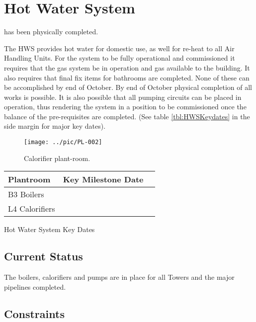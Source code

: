 \chapter{Hot Water System  }


 has been physically completed.

The HWS provides hot water for domestic use, as well for re-heat to all Air Handling Units. For the system to be fully operational and commissioned it requires that the gas system  be in operation and gas available to the building. It also requires that final fix items for bathrooms are completed. None of these can be accomplished by end of October. By end of October physical completion of all works is possible. It is also possible that all pumping circuits can be placed in operation, thus rendering the system in a position to be commissioned once the balance of the pre-requisites are completed. (See table \ref{tbl:HWSKeydates} in the side margin for major key dates).

\begin{figure*}
  \texttt{[image: ../pic/PL-002]}
  \caption{Calorifier plant-room.}
  \label{fig:MWcalorifiers}
\end{figure*}

           \begin{margintable} 
	    \begin{tabular}{lcl}
	      \toprule
	      Plantroom    & Key Milestone Date  \\
	      \midrule
	      B3 Boilers             &  \podiumon  \\
	      L4 Calorifiers       &  \toweron  \\
	      \bottomrule
	    \end{tabular}
           \caption{Hot Water System Key Dates}
           \label{tbl:HWSKeydates}
            \end{margintable}
 

\section{Current Status}

The boilers, calorifiers and pumps are in place for all Towers and the major pipelines completed. 

\section{Constraints}


